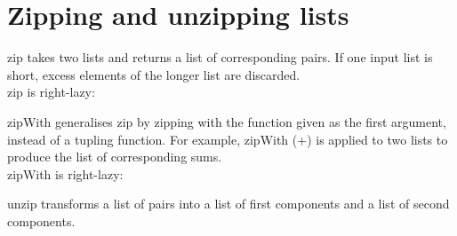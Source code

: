 \section{Zipping and unzipping lists}
zip takes two lists and returns a list of corresponding pairs. If one input list is short, excess elements of the longer list are discarded.\\
zip is right-lazy:

zipWith generalises zip by zipping with the function given as the first argument, instead of a tupling function. For example, zipWith (+) is applied to two lists to produce the list of corresponding sums.\\
zipWith is right-lazy:

unzip transforms a list of pairs into a list of first components and a list of second components.
